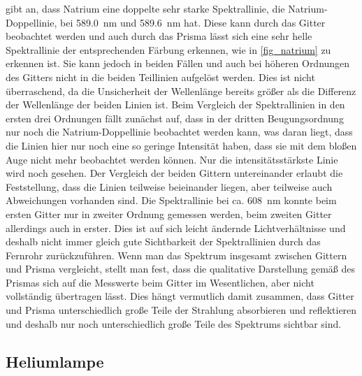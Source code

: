 \documentclass[
	a4paper,
	12pt,
	pagesize,
	ngerman
]{scrartcl}
\begin{document}
	\cite{NatriumDoppel} gibt an, dass Natrium eine doppelte sehr starke Spektrallinie, die Natrium-Doppellinie, bei \SI{589,0}{\nano \meter} und \SI{589,6}{\nano \meter} hat.
	Diese kann durch das Gitter beobachtet werden und auch durch das Prisma lässt sich eine sehr helle Spektrallinie der entsprechenden Färbung erkennen, wie in \cref{fig_natrium} zu erkennen ist.
	Sie kann jedoch in beiden Fällen und auch bei höheren Ordnungen des Gitters nicht in die beiden Teillinien aufgelöst werden.
	Dies ist nicht überraschend, da die Unsicherheit der Wellenlänge bereits größer als die Differenz der Wellenlänge der beiden Linien ist.
	Beim Vergleich der Spektrallinien in den ersten drei Ordnungen fällt zunächst auf, dass in der dritten Beugungsordnung nur noch die Natrium-Doppellinie beobachtet werden kann, was daran liegt, dass die Linien hier nur noch eine so geringe Intensität haben, dass sie mit dem bloßen Auge nicht mehr beobachtet werden können.
	Nur die intensitätsstärkste Linie wird noch gesehen.
	Der Vergleich der beiden Gittern untereinander erlaubt die Feststellung, dass die Linien teilweise beieinander liegen, aber teilweise auch Abweichungen vorhanden sind.
	Die Spektrallinie bei ca. \SI{608}{\nano \meter} konnte beim ersten Gitter nur in zweiter Ordnung gemessen werden, beim zweiten Gitter allerdings auch in erster.
	Dies ist auf sich leicht ändernde Lichtverhältnisse und deshalb nicht immer gleich gute Sichtbarkeit der Spektrallinien durch das Fernrohr zurückzuführen.
	Wenn man das Spektrum insgesamt zwischen Gittern und Prisma vergleicht, stellt man fest, dass die qualitative Darstellung gemäß des Prismas sich auf die Messwerte beim Gitter im Wesentlichen, aber nicht vollständig übertragen lässt.
	Dies hängt vermutlich damit zusammen, dass Gitter und Prisma unterschiedlich große Teile der Strahlung absorbieren und reflektieren und deshalb nur noch unterschiedlich große Teile des Spektrums sichtbar sind.
	
	
	\subsection{Heliumlampe} \label{ss_helium}
\end{document}
